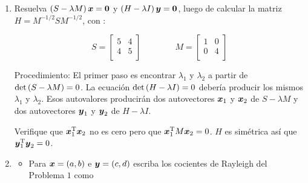 \documentclass[12pt,a4paper]{article}
\newcommand{\bi}[1]{\hbox{\boldmath$#1$}}
\newcommand\1{\mbox{\,\vrule height-0.8pt depth1.0pt width2pc\,}}
\newcommand\2{\mbox{\,\vrule height-0.8pt depth1.0pt width1pc\,}}
\DeclareRobustCommand\transp{^{\mathrm{T}}}
\begin{document}
\begin{enumerate}

\item Resuelva $(S-\lambda M)\,\bi{x}=\bi{0}$ y $(H-\lambda I)\,\bi{y}=\bi{0}$, luego de calcular la matriz $H=M^{-1/2}SM^{-1/2}$, con :

\vspace{-9pt}
$$
S=\left[\begin{array}{rr}5&4\\4&5\\\end{array}\right]\qquad\qquad
M=\left[\begin{array}{rr}1&0\\0&4\\\end{array}\right]
$$

Procedimiento: El primer paso es encontrar $\lambda_1$ y $\lambda_2$ a partir de $\hbox{det}\,(S-\lambda M)=0$. La ecuación $\hbox{det}\,(H-\lambda I)=0$ debería producir los mismos $\lambda_1$ y $\lambda_2$. Esos autovalores producirán dos autovectores $\bi{x}_1$ y $\bi{x}_2$ de $S-\lambda M$ y dos autovectores $\bi{y}_1$ y $\bi{y}_2$ de $H-\lambda I$.%

Verifique que $\bi{x}_1\transp\bi{x}_2$ no es cero pero que $\bi{x}_1\transp M\bi{x}_2=0$. $H$ es simétrica así que $\bi{y}_1\transp\bi{y}_2=0$.

\item
\begin{itemize}
\item [(a)]Para $\bi{x}=(a,b)$ e $\bi{y}=(c,d)$ escriba  los cocientes de Rayleigh del Problema $1$ como
\end{itemize}


\end{enumerate}
\end{document}
